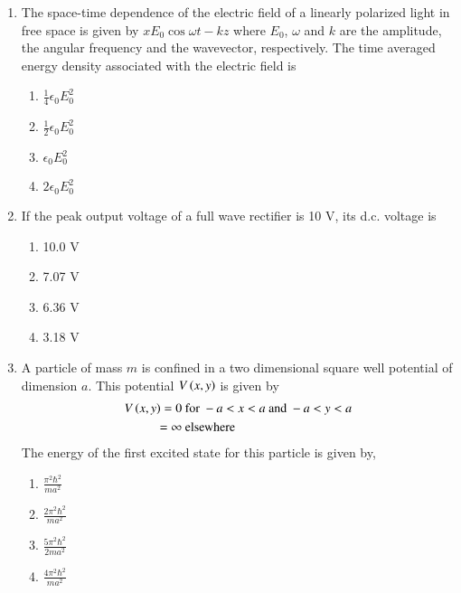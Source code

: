 \documentclass[journal]{IEEEtran}
\begin{document}
\begin{enumerate}
\item The space-time dependence of the electric field of a linearly polarized light in free space is given by $xE_0 \cos{\omega t - kz}$ where $E_0$, $\omega$ and $k$ are the amplitude, the angular frequency and the wavevector, respectively. The time averaged energy density associated with the electric field is
\begin{multicols}{2}
    \begin{enumerate}
        \item $\frac{1}{4} \epsilon_0 E_0^2$
        \item $\frac{1}{2} \epsilon_0 E_0^2$
        \item $\epsilon_0 E_0^2$
        \item $2 \epsilon_0 E_0^2$
    \end{enumerate}
\end{multicols}

\item If the peak output voltage of a full wave rectifier is 10 V, its d.c. voltage is
\begin{multicols}{2}
    \begin{enumerate}
        \item 10.0 V
        \item 7.07 V
        \item 6.36 V
        \item 3.18 V
    \end{enumerate}
\end{multicols}

\item A particle of mass $m$ is confined in a two dimensional square well potential of dimension $a$. This
potential $V\left(x,y\right)$ is given by
\begin{align*}
    V\left(x,y\right) = 0 & \text{ for } -a < x < a \text{ and } -a < y < a\\
    = \infty &  \text{ elsewhere}
\end{align*}
The energy of the first excited state for this particle is given by,
\begin{multicols}{2}
    \begin{enumerate}
        \item $\frac{\pi^2 \hbar^2}{m a^2}$
        \item $\frac{2 \pi^2 \hbar^2}{m a^2}$
        \item $\frac{5 \pi^2 \hbar^2}{2 m a^2}$
        \item $\frac{4 \pi^2 \hbar^2}{m a^2}$
    \end{enumerate}
\end{multicols}


\end{enumerate}
\end{document}
